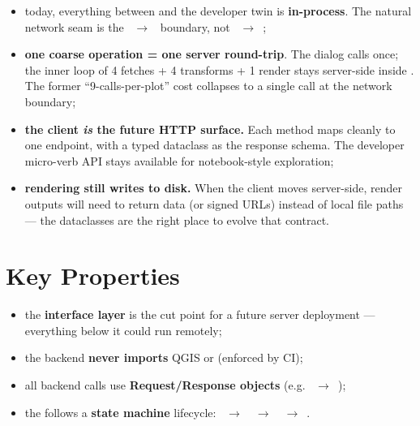 \begin{itemize}
    \item today, everything between  and the developer twin is \textbf{in-process}. The natural network seam is the ~$\rightarrow$~ boundary, not ~$\rightarrow$~;
    \item \textbf{one coarse operation = one server round-trip}. The dialog calls  once; the inner loop of 4 fetches + 4 transforms + 1 render stays server-side inside . The former ``9-calls-per-plot'' cost collapses to a single call at the network boundary;
    \item \textbf{the client \emph{is} the future HTTP surface.} Each  method maps cleanly to one endpoint, with a typed  dataclass as the response schema. The developer micro-verb API stays available for notebook-style exploration;
    \item \textbf{rendering still writes to disk.} When the client moves server-side, render outputs will need to return data (or signed URLs) instead of local file paths --- the  dataclasses are the right place to evolve that contract.
\end{itemize}

\section{Key Properties}
\label{sec-key-properties}

\begin{itemize}
    \item the \textbf{interface layer} is the cut point for a future server deployment --- everything below it could run remotely;
    \item the backend \textbf{never imports} QGIS or  (enforced by CI);
    \item all backend calls use \textbf{Request/Response objects} (e.g. ~$\rightarrow$~);
    \item the  follows a \textbf{state machine} lifecycle: ~$\rightarrow$~~$\rightarrow$~~$\rightarrow$~.
\end{itemize}
